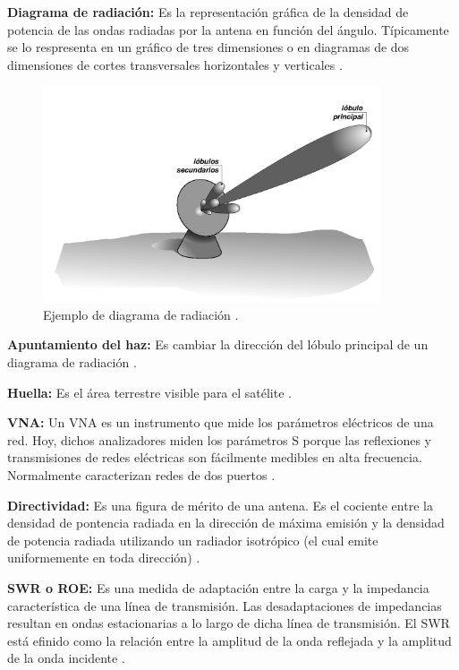 {\textbf{Diagrama de radiación:}} Es la representación gráfica de la densidad de potencia de las ondas radiadas por la antena
en función del ángulo. Típicamente se lo respresenta en un gráfico de tres dimensiones o en diagramas de dos dimensiones de
cortes transversales horizontales y verticales \cite{AntennaWiki}.

\begin{figure}[H]
 \centering
 \includegraphics[width=10cm]{gfx/arrayPattern.png}
 \caption{Ejemplo de diagrama de radiación \cite{diagramaRadiacion}.}
\end{figure}

{\textbf{Apuntamiento del haz:}} Es cambiar la dirección del lóbulo principal de un diagrama de radiación \cite{BeamSteering}.

{\textbf{Huella:}} Es el área terrestre visible para el satélite \cite{Footprint}. 

{\textbf{VNA:}} Un VNA es un instrumento que mide los parámetros eléctricos de una red. Hoy, dichos analizadores miden los 
parámetros S porque las reflexiones y transmisiones de redes eléctricas son fácilmente medibles en alta frecuencia. Normalmente
caracterizan redes de dos puertos \cite{NetworkAnalyzer}.

{\textbf{Directividad:}} Es una figura de mérito de una antena. Es el cociente entre la densidad de pontencia radiada en la
dirección de máxima emisión y la densidad de potencia radiada utilizando un radiador isotrópico (el cual emite uniformemente
en toda dirección) \cite{DirectivityWiki}.

{\textbf{SWR o ROE:}} Es una medida de adaptación entre la carga y la impedancia característica de una línea de transmisión. Las
desadaptaciones de impedancias resultan en ondas estacionarias a lo largo de dicha línea de transmisión. El SWR está
efinido como la relación entre la amplitud de la onda reflejada y la amplitud de la onda incidente \cite{swrWiki}.


